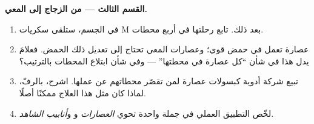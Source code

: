 \begin{problem}
\medskip\noindent\textbf{القسم الثالث --- من الزجاج إلى المعي.}
\begin{enumerate}[resume]
  \item في الجسم، ستلقى سكريات M  بعد ذلك. تابع رحلتها
        في أربع محطات.
  \item عصارة  تعمل في حمض قوي؛ وعصارات المعي تحتاج إلى
        تعديل ذلك الحمض. فعلامَ يدل هذا في شأن ``كل عصارة في
         محطتها'' --- وفي شأن ابتلاع المحطات بالترتيب؟
  \item تبيع شركة أدوية كبسولات عصارة لمن تقصّر محطاتهم عن
        عملها. اشرح، بالرفّ، لماذا كان مثل هذا العلاج ممكنًا
        أصلًا.
  \item لخّص التطبيق العملي في جملة واحدة تحوي \emph{العصارات}
        و\emph{} و\emph{أنابيب الشاهد}.
\end{enumerate}
\end{problem}

